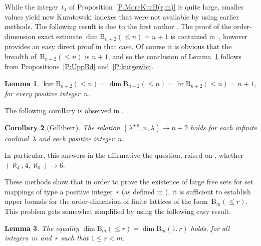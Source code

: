 \documentclass[psamsfonts,reqno]{amsart}
\theoremstyle{plain}
\newtheorem{lemma}{Lemma}[section]
\newtheorem{corollary}[lemma]{Corollary}
\theoremstyle{definition}
\theoremstyle{remark}
\numberwithin{equation}{section}
\numberwithin{figure}{section}
\newcommand{\gl}{\lambda}
\newcommand{\les}{\leqslant}
\DeclareMathOperator{\kur}{kur}
\DeclareMathOperator{\brd}{br}
\newcommand{\rB}{\mathrm{B}}
\begin{document}
While the integer~$t_4$ of Proposition~\ref{P:MoreKurB(r,m)} is quite large, smaller values yield new Kuratowski indexes that were not available by using earlier methods. The following result is due to the first author \cite[Lemme~3.3.12]{GillTh}. The proof of the order-dimension exact estimate $\dim\rB_{n+2}({\les}n)=n+1$ is contained in~\cite{Dush50}, however \cite[Lemme~3.3.12]{GillTh} provides an easy direct proof in that case. Of course it is obvious that the breadth of~$\rB_{n+2}({\les}n)$ is $n+1$, and so the conclusion of Lemma~\ref{L:OrdDImBrm} follows from Propositions~\ref{P:UppBd} and~\ref{P:kurgewbr}.

\begin{lemma}\label{L:OrdDImBrm}
$\kur\rB_{n+2}({\les}n)=\dim\rB_{n+2}({\les}n)=\brd\rB_{n+2}({\les}n)=n+1$, for every positive integer~$n$.
\end{lemma}

The following corollary is observed in \cite[Th\'eor\`eme~3.3.13]{GillTh}.

\begin{corollary}[Gillibert]\label{C:Pierren+2}
The relation $(\gl^{+n},n,\gl)\to n+2$ holds for each infinite cardinal~$\gl$ and each positive integer~$n$.
\end{corollary}

In particular, this answers in the affirmative the question, raised on \cite[page~285]{EHMR}, whether $(\aleph_4,4,\aleph_0)\to6$.

These methods show that in order to prove the existence of large free sets for set mappings of type a positive integer~$r$ (as defined in \cite[Section~46]{EHMR}), it is sufficient to establish upper bounds for the order-dimension of finite lattices of the form~$\rB_m({\les}r)$. This problem gets somewhat simplified by using the following easy result.

\begin{lemma}\label{L:dim1tor}
The equality $\dim\rB_m({\les}r)=\dim\rB_m(1,r)$ holds, for all integers~$m$ and~$r$ such that $1\leq r<m$.
\end{lemma}
\end{document}

